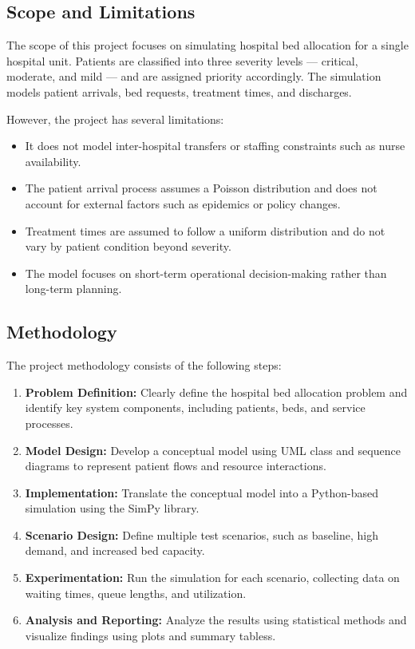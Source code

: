 \documentclass[12pt]{article}
\begin{document}
\subsection{Scope and Limitations}


The scope of this project focuses on simulating hospital bed allocation for a single hospital unit. Patients are classified into three severity levels --- critical, moderate, and mild --- and are assigned priority accordingly. The simulation models patient arrivals, bed requests, treatment times, and discharges.

However, the project has several limitations:
\begin{itemize}
    \item It does not model inter-hospital transfers or staffing constraints such as nurse availability.
    \item The patient arrival process assumes a Poisson distribution and does not account for external factors such as epidemics or policy changes.
    \item Treatment times are assumed to follow a uniform distribution and do not vary by patient condition beyond severity.
    \item The model focuses on short-term operational decision-making rather than long-term planning.
\end{itemize}

\subsection{Methodology}

The project methodology consists of the following steps:

\begin{enumerate}
    \item \textbf{Problem Definition:} Clearly define the hospital bed allocation problem and identify key system components, including patients, beds, and service processes.
    \item \textbf{Model Design:} Develop a conceptual model using UML class and sequence diagrams to represent patient flows and resource interactions.
    \item \textbf{Implementation:} Translate the conceptual model into a Python-based simulation using the SimPy library.
    \item \textbf{Scenario Design:} Define multiple test scenarios, such as baseline, high demand, and increased bed capacity.
    \item \textbf{Experimentation:} Run the simulation for each scenario, collecting data on waiting times, queue lengths, and utilization.
    \item \textbf{Analysis and Reporting:} Analyze the results using statistical methods and visualize findings using plots and summary tabless.
\end{enumerate}
\end{document}
